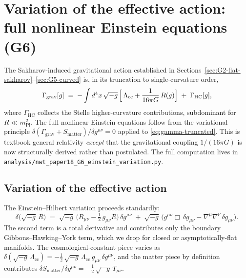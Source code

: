 \documentclass[11pt]{article}
\newcommand{\mPl}{m_{\mathrm{Pl}}}
\begin{document}
\section{Variation of the effective action: full nonlinear
Einstein equations (G6)}
\label{sec:G6-einstein}

The Sakharov-induced gravitational action established in
Sections~\ref{sec:G2-flat-sakharov}--\ref{sec:G5-curved} is, in
its truncation to single-curvature order,
\begin{equation}
  \Gamma_{\mathrm{grav}}[g]
   \;=\;
   -\int d^4 x\,\sqrt{-g}\,
   \Bigl[\,
       \Lambda_{\mathrm{cc}}
     + \frac{1}{16\pi G}\,R(g)
   \Bigr]
   \;+\;\Gamma_{\mathrm{HC}}[g],
  \label{eq:gamma-truncated}
\end{equation}
where $\Gamma_{\mathrm{HC}}$ collects the Stelle higher-curvature
contributions, subdominant for $R \ll \mPl^2$.  The full nonlinear
Einstein equations follow from the variational principle
$\delta(\Gamma_{\mathrm{grav}} + S_{\mathrm{matter}})/\delta g^{\mu\nu}
= 0$ applied to \eqref{eq:gamma-truncated}.  This is textbook
general relativity \emph{except} that the gravitational coupling
$1/(16\pi G)$ is now structurally derived rather than postulated.
The full computation lives in
\texttt{analysis/}\allowbreak\texttt{nwt\_\allowbreak paper18\_\allowbreak G6\_\allowbreak einstein\_\allowbreak variation.py}.

\subsection{Variation of the effective action}

The Einstein--Hilbert variation proceeds standardly:
\begin{equation}
  \delta\bigl(\sqrt{-g}\,R\bigr)
   \;=\;
   \sqrt{-g}\,\bigl(R_{\mu\nu} - \tfrac{1}{2}\,g_{\mu\nu} R\bigr)\,\delta g^{\mu\nu}
   \;+\;
   \sqrt{-g}\,\bigl(g^{\mu\nu}\Box\,\delta g_{\mu\nu}
                     - \nabla^\mu\nabla^\nu\,\delta g_{\mu\nu}\bigr).
\end{equation}
The second term is a total derivative and contributes only the
boundary Gibbons--Hawking--York term, which we drop for closed
or asymptotically-flat manifolds.  The cosmological-constant
piece varies as
$\delta(\sqrt{-g}\,\Lambda_{\mathrm{cc}}) =
-\tfrac{1}{2}\,\sqrt{-g}\,\Lambda_{\mathrm{cc}}\,g_{\mu\nu}\,
\delta g^{\mu\nu}$, and the matter piece by definition contributes
$\delta S_{\mathrm{matter}}/\delta g^{\mu\nu}
= -\tfrac{1}{2}\,\sqrt{-g}\,T_{\mu\nu}$.
\end{document}
